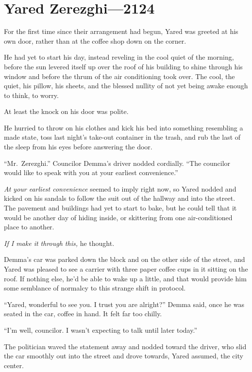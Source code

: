 \hypertarget{yared-zerezghi-2124}{%
\chapter{Yared Zerezghi—2124}\label{yared-zerezghi-2124}}

For the first time since their arrangement had begun, Yared was greeted at his own door, rather than at the coffee shop down on the corner.

He had yet to start his day, instead reveling in the cool quiet of the morning, before the sun levered itself up over the roof of his building to shine through his window and before the thrum of the air conditioning took over. The cool, the quiet, his pillow, his sheets, and the blessed nullity of not yet being awake enough to think, to worry.

At least the knock on his door was polite.

He hurried to throw on his clothes and kick his bed into something resembling a made state, toss last night's take-out container in the trash, and rub the last of the sleep from his eyes before answering the door.

``Mr.~Zerezghi.'' Councilor Demma's driver nodded cordially. ``The councilor would like to speak with you at your earliest convenience.''

\emph{At your earliest convenience} seemed to imply right now, so Yared nodded and kicked on his sandals to follow the suit out of the hallway and into the street. The pavement and buildings had yet to start to bake, but he could tell that it would be another day of hiding inside, or skittering from one air-conditioned place to another.

\emph{If I make it through this,} he thought.

Demma's car was parked down the block and on the other side of the street, and Yared was pleased to see a carrier with three paper coffee cups in it sitting on the roof. If nothing else, he'd be able to wake up a little, and that would provide him some semblance of normalcy to this strange shift in protocol.

``Yared, wonderful to see you. I trust you are alright?'' Demma said, once he was seated in the car, coffee in hand. It felt far too chilly.

``I'm well, councilor. I wasn't expecting to talk until later today.''

The politician waved the statement away and nodded toward the driver, who slid the car smoothly out into the street and drove towards, Yared assumed, the city center.

